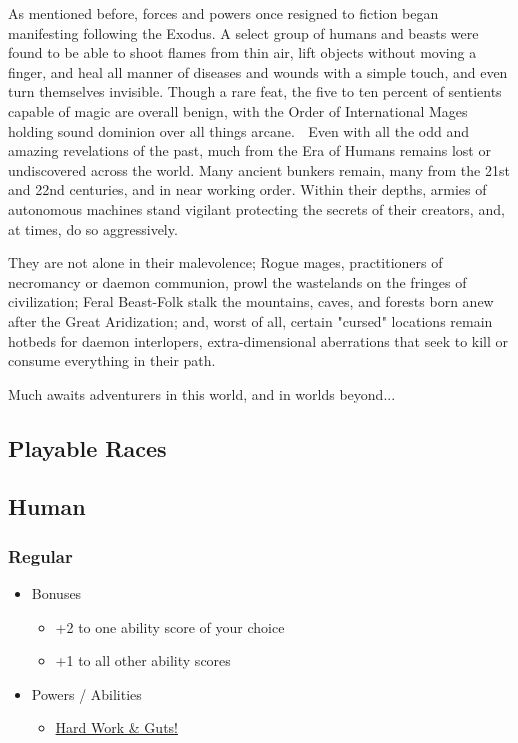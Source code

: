 \documentclass[12pt, landscape]{article}
\begin{document}
\begin{FlushLeft}
\begin{multicols}{3}
			As mentioned before, forces and powers once resigned to fiction began manifesting following the Exodus. A select group of humans and beasts were found to be able to shoot flames from thin air, lift objects without moving a finger, and heal all manner of diseases and wounds with a simple touch, and even turn themselves invisible. Though a rare feat, the five to ten percent of sentients capable of magic are overall benign, with the Order of International Mages holding sound dominion over all things arcane. \vfill \null \columnbreak

			Even with all the odd and amazing revelations of the past, much from the Era of Humans remains lost or undiscovered across the world. Many ancient bunkers remain, many from the 21st and 22nd centuries, and in near working order. Within their depths, armies of autonomous machines stand vigilant protecting the secrets of their creators, and, at times, do so aggressively. \linebreak

			They are not alone in their malevolence; Rogue mages, practitioners of necromancy or daemon communion, prowl the wastelands on the fringes of civilization; Feral Beast-Folk stalk the mountains, caves, and forests born anew after the Great Aridization; and, worst of all, certain "cursed" locations remain hotbeds for daemon interlopers, extra-dimensional aberrations that seek to kill or consume everything in their path. \linebreak

			Much awaits adventurers in this world, and in worlds beyond...
			\vfill
			\pagebreak
		\end{multicols}

		\begin{multicols}{2}
			\section{Playable Races}
			\subsection{Human}
			\subsubsection{Regular}
			\begin{itemize}
				\item Bonuses
				\begin{itemize}
					\item +2 to one ability score of your choice
					\item +1 to all other ability scores
				\end{itemize}
				\item Powers  / Abilities
				\begin{itemize}
					\item \underline{Hard Work \& Guts!}


\end{itemize}
\end{itemize}
\end{multicols}
\end{FlushLeft}
\end{document}
